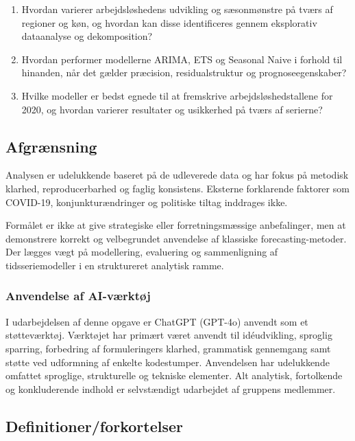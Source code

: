 \documentclass[
]{article}
\begin{document}
\begin{enumerate}
\def\labelenumi{\arabic{enumi}.}
\item
  Hvordan varierer arbejdsløshedens udvikling og sæsonmønstre på tværs
  af regioner og køn, og hvordan kan disse identificeres gennem
  eksplorativ dataanalyse og dekomposition?
\item
  Hvordan performer modellerne ARIMA, ETS og Seasonal Naive i forhold
  til hinanden, når det gælder præcision, residualstruktur og
  prognoseegenskaber?
\item
  Hvilke modeller er bedst egnede til at fremskrive
  arbejdsløshedstallene for 2020, og hvordan varierer resultater og
  usikkerhed på tværs af serierne?
\end{enumerate}

\subsection{Afgrænsning}\label{afgruxe6nsning}

Analysen er udelukkende baseret på de udleverede data og har fokus på
metodisk klarhed, reproducerbarhed og faglig konsistens. Eksterne
forklarende faktorer som COVID-19, konjunkturændringer og politiske
tiltag inddrages ikke.

Formålet er ikke at give strategiske eller forretningsmæssige
anbefalinger, men at demonstrere korrekt og velbegrundet anvendelse af
klassiske forecasting-metoder. Der lægges vægt på modellering,
evaluering og sammenligning af tidsseriemodeller i en struktureret
analytisk ramme.

\subsubsection{Anvendelse af
AI-værktøj}\label{anvendelse-af-ai-vuxe6rktuxf8j}

I udarbejdelsen af denne opgave er ChatGPT (GPT-4o) anvendt som et
støtteværktøj. Værktøjet har primært været anvendt til idéudvikling,
sproglig sparring, forbedring af formuleringers klarhed, grammatisk
gennemgang samt støtte ved udformning af enkelte kodestumper.
Anvendelsen har udelukkende omfattet sproglige, strukturelle og tekniske
elementer. Alt analytisk, fortolkende og konkluderende indhold er
selvstændigt udarbejdet af gruppens medlemmer.

\subsection{Definitioner/forkortelser}\label{definitionerforkortelser}
\end{document}
